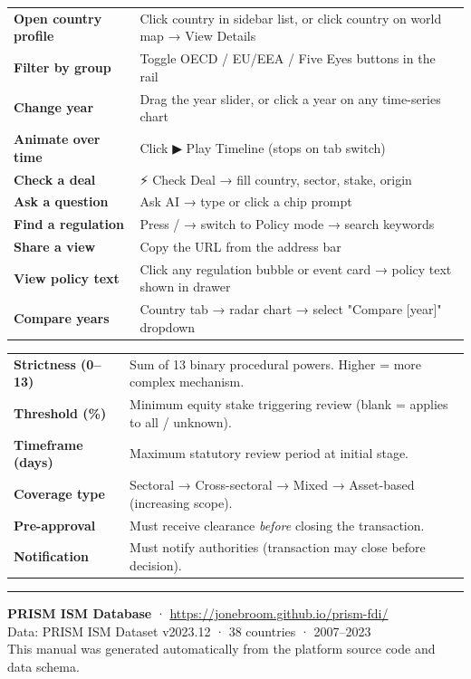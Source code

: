 \documentclass[12pt,a4paper]{article}
\begin{document}
\begin{tcolorbox}[enhanced, colback=lightgray, colframe=midgray, arc=6pt, title={\textbf{PRISM at a Glance}}, fonttitle=\bfseries]
\small
\begin{tabular}{@{}p{4cm}p{9.5cm}@{}}
\textbf{Open country profile} & Click country in sidebar list, or click country on world map → View Details \\[3pt]
\textbf{Filter by group} & Toggle OECD / EU/EEA / Five Eyes buttons in the rail \\[3pt]
\textbf{Change year} & Drag the year slider, or click a year on any time-series chart \\[3pt]
\textbf{Animate over time} & Click ▶ Play Timeline (stops on tab switch) \\[3pt]
\textbf{Check a deal} & ⚡ Check Deal → fill country, sector, stake, origin \\[3pt]
\textbf{Ask a question} & Ask AI → type or click a chip prompt \\[3pt]
\textbf{Find a regulation} & Press / → switch to Policy mode → search keywords \\[3pt]
\textbf{Share a view} & Copy the URL from the address bar \\[3pt]
\textbf{View policy text} & Click any regulation bubble or event card → policy text shown in drawer \\[3pt]
\textbf{Compare years} & Country tab → radar chart → select "Compare [year]" dropdown \\[3pt]
\end{tabular}
\end{tcolorbox}

\vspace{1em}
\begin{tcolorbox}[enhanced, colback=prismclay!6, colframe=prismclay!40, arc=6pt, title={\textbf{Data Field Quick Reference}}, fonttitle=\bfseries]
\small
\begin{tabular}{@{}p{3.5cm}p{10cm}@{}}
\textbf{Strictness (0–13)} & Sum of 13 binary procedural powers. Higher = more complex mechanism. \\[3pt]
\textbf{Threshold (\%)} & Minimum equity stake triggering review (blank = applies to all / unknown). \\[3pt]
\textbf{Timeframe (days)} & Maximum statutory review period at initial stage. \\[3pt]
\textbf{Coverage type} & Sectoral → Cross-sectoral → Mixed → Asset-based (increasing scope). \\[3pt]
\textbf{Pre-approval} & Must receive clearance \textit{before} closing the transaction. \\[3pt]
\textbf{Notification} & Must notify authorities (transaction may close before decision). \\[3pt]
\end{tabular}
\end{tcolorbox}

\vspace{2em}
\hrule
\vspace{0.5em}
{\small\color{gray}
\textbf{PRISM ISM Database} · \url{https://jonebroom.github.io/prism-fdi/}\\
Data: PRISM ISM Dataset v2023.12 · 38 countries · 2007--2023\\
This manual was generated automatically from the platform source code and data schema.
}
\end{document}
